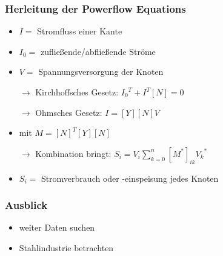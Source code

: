 \documentclass[aspectratio=169,t]{beamer}
\begin{document}
\begin{frame}
	
		\frametitle{Herleitung der Powerflow Equations}
		
		\vspace*{2mm}
	 
	 \begin{itemize}
	 	\item $I =$ Stromfluss einer Kante
	 	
	 	\item $I_0 =$ zufließende/abfließende Ströme
	 	
	 	\item $V =$ Spannungsversorgung der Knoten
	 	
	 	\item [$\rightarrow$] Kirchhoffsches Gesetz: ${I_0}^{T} + I^{T}[N] = 0$
	 	
	 	\item [$\rightarrow$] Ohmsches Gesetz: $ I = [Y][N]V$
	 	
	 	\item mit $M = [N]^T[Y][N]$
	 	
	 	\vspace{2mm}
	 	
	 	\item [$\rightarrow$] Kombination bringt: $ S_i = V_i \displaystyle \sum_{k=0} ^{n} [M^*]_{ik} {V_k}^*$
	 	
	 	\item $S_i =$ Stromverbrauch oder -einspeisung jedes Knoten
	 	
	 \end{itemize}
	
		\vspace*{0mm}
	\end{frame}
	
	

	
	
	\begin{frame}
		\frametitle{Ausblick}
		
		\vspace*{6mm}
		\begin{itemize}
			\item weiter Daten suchen 
			\item Stahlindustrie betrachten
		\end{itemize}
			
		
	\end{frame}
	
	
	
	
	
	
	
\end{document}
